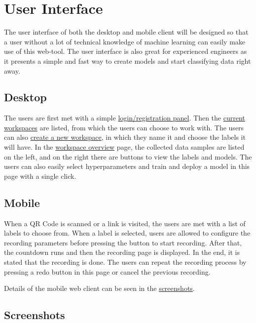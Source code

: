 \section{User Interface}
The user interface of both the desktop and mobile client will be designed so that a user without a lot of technical knowledge of machine learning can easily make use of this web-tool. The user interface is also great for experienced engineers as it presents a simple and fast way to create models and start classifying data right away.

\subsection{Desktop}
The users are first met with a simple \hyperref[fig:login]{login/registration panel}. Then the \hyperref[fig:workspaces-list]{current workspaces} are listed, from which the users can choose to work with. The users can also \hyperref[fig:create-workspace]{create a new workspace}, in which they name it and choose the labels it will have. In the \hyperref[fig:workspace-overview]{workspace overview} page, the collected data samples are listed on the left, and on the right there are buttons to view the labels and models. The users can also easily select hyperparameters and train and deploy a model in this page with a single click. 


\subsection{Mobile}
When a QR Code is scanned or a link is visited, the users are met with a list of labels to choose from. When a label is selected, users are allowed to configure the recording parameters before pressing the button to start recording. After that, the countdown runs and then the recording page is displayed. In the end, it is stated that the recording is done. The users can repeat the recording process by pressing a redo button in this page or cancel the previous recording.

Details of the mobile web client can be seen in the \hyperref[fig:mobile]{screenshots}.

\subsection{Screenshots}

